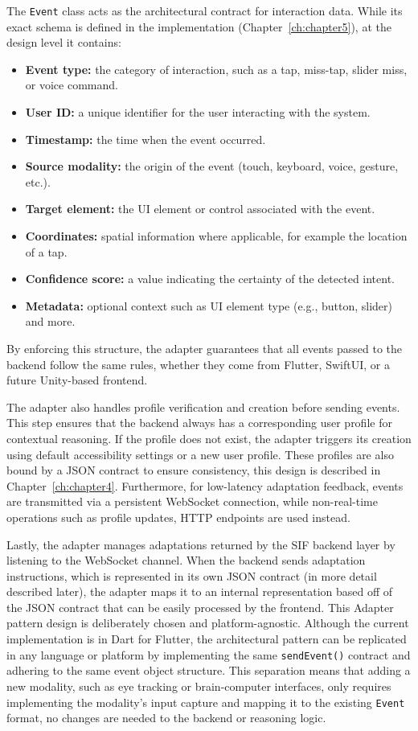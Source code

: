 \documentclass[openany]{book}
\begin{document}
The \texttt{Event} class acts as the architectural contract for interaction data. While its exact schema is defined in the implementation (Chapter~\ref{ch:chapter5}), at the design level it contains:
\begin{itemize}
    \item \textbf{Event type:}  the category of interaction, such as a tap, miss-tap, slider miss, or voice command.
    \item \textbf{User ID:} a unique identifier for the user interacting with the system.
    \item \textbf{Timestamp:} the time when the event occurred.
    \item \textbf{Source modality:} the origin of the event (touch, keyboard, voice, gesture, etc.).
    \item \textbf{Target element:} the UI element or control associated with the event.
    \item \textbf{Coordinates:} spatial information where applicable, for example the location of a tap.
    \item \textbf{Confidence score:} a value indicating the certainty of the detected intent.
    \item \textbf{Metadata:} optional context such as UI element type (e.g., button, slider) and more.
\end{itemize}
By enforcing this structure, the adapter guarantees that all events passed to the backend follow the same rules, whether they come from Flutter, SwiftUI, or a future Unity-based frontend.

The adapter also handles profile verification and creation before sending events. This step ensures that the backend always has a corresponding user profile for contextual reasoning. If the profile does not exist, the adapter triggers its creation using default accessibility settings or a new user profile. These profiles are also bound by a JSON contract to ensure consistency, this design is described in Chapter~\ref{ch:chapter4}. Furthermore, for low-latency adaptation feedback, events are transmitted via a persistent WebSocket connection, while non-real-time operations such as profile updates, HTTP endpoints are used instead.

Lastly, the adapter manages adaptations returned by the SIF backend layer by listening to the WebSocket channel. When the backend sends adaptation instructions, which is represented in its own JSON contract (in more detail described later), the adapter maps it to an internal representation based off of the JSON contract that can be easily processed by the frontend. This Adapter pattern design is deliberately chosen and platform-agnostic. Although the current implementation is in Dart for Flutter, the architectural pattern can be replicated in any language or platform by implementing the same \texttt{sendEvent()} contract and adhering to the same event object structure. This separation means that adding a new modality, such as eye tracking or brain-computer interfaces, only requires implementing the modality’s input capture and mapping it to the existing \texttt{Event} format, no changes are needed to the backend or reasoning logic.
\end{document}
